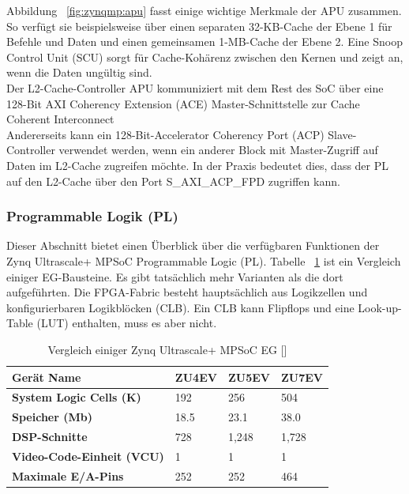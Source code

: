 Abbildung ~\ref{fig:zynqmp:apu} fasst einige wichtige Merkmale der APU zusammen. So verfügt sie beispielsweise über einen separaten 32-KB-Cache der Ebene 1 für Befehle und Daten und einen gemeinsamen 1-MB-Cache der Ebene 2. Eine Snoop Control Unit (SCU) sorgt für Cache-Kohärenz zwischen den Kernen und zeigt an, wenn die Daten ungültig sind.\\
Der L2-Cache-Controller APU kommuniziert mit dem Rest des SoC über eine 128-Bit AXI Coherency Extension (ACE) Master-Schnittstelle zur Cache Coherent Interconnect\\
Andererseits kann ein 128-Bit-Accelerator Coherency Port (ACP) Slave-Controller verwendet werden, wenn ein anderer Block mit Master-Zugriff auf Daten im L2-Cache zugreifen möchte. In der Praxis bedeutet dies, dass der PL auf den L2-Cache über den Port S_AXI_ACP_FPD zugriffen kann.

\subsubsection{Programmable Logik (PL)}
Dieser Abschnitt bietet einen Überblick über die verfügbaren Funktionen der Zynq Ultrascale+ MPSoC Programmable Logic (PL). Tabelle ~\ref{tab:zcu:vergleich} ist ein Vergleich einiger EG-Bausteine. Es gibt tatsächlich mehr Varianten als die dort aufgeführten. Die FPGA-Fabric besteht hauptsächlich aus Logikzellen und konfigurierbaren Logikblöcken (CLB). Ein CLB kann Flipflops und eine Look-up-Table (LUT) enthalten, muss es aber nicht.\\

\begin{table}[htbp]
	\centering
	\begin{tabular}{|p{5cm}|p{2cm}|p{2cm}|p{2cm}|}
		\toprule
		\textbf{Gerät Name} & ZU4EV & ZU5EV & ZU7EV \\
		\midrule
		\textbf{System Logic Cells (K)} & 192 & 256 & 504 \\
		\textbf{Speicher (Mb)} & 18.5 & 23.1 & 38.0 \\
		\textbf{DSP-Schnitte} & 728 & 1,248 & 1,728 \\
		\textbf{Video-Code-Einheit (VCU)} & 1 & 1 & 1 \\
		\textbf{Maximale E/A-Pins} & 252 & 252 & 464 \\
		\bottomrule
	\end{tabular}
	\caption[Vergleich einiger Zynq Ultrascale+ MPSoC EG ]{Vergleich einiger Zynq Ultrascale+ MPSoC EG [\cite{XilinxInc.}]}
	\label{tab:zcu:vergleich}
\end{table}

